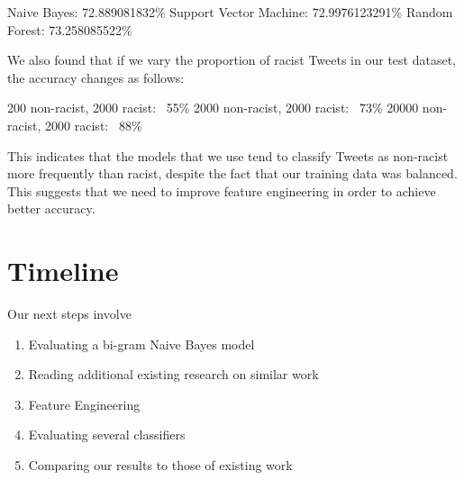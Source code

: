 \documentclass[]{article}
\begin{document}
Naive Bayes: 72.889081832\%
Support Vector Machine: 72.9976123291\%
Random Forest: 73.258085522\%

We also found that if we vary the proportion of racist Tweets in our test dataset, the accuracy changes as follows:

200 non-racist, 2000 racist: ~55\%
2000 non-racist, 2000 racist: ~73\%
20000 non-racist, 2000 racist: ~88\%

This indicates that the models that we use tend to classify Tweets as non-racist more frequently than racist, despite the fact that our training data was balanced. This suggests that we need to improve feature engineering in order to achieve better accuracy.

\section{Timeline}

Our next steps involve

\begin{enumerate}
	\item Evaluating a bi-gram Naive Bayes model
	\item Reading additional existing research on similar work
	\item Feature Engineering
	\item Evaluating several classifiers
	\item Comparing our results to those of existing work
\end{enumerate} 
\end{document}
